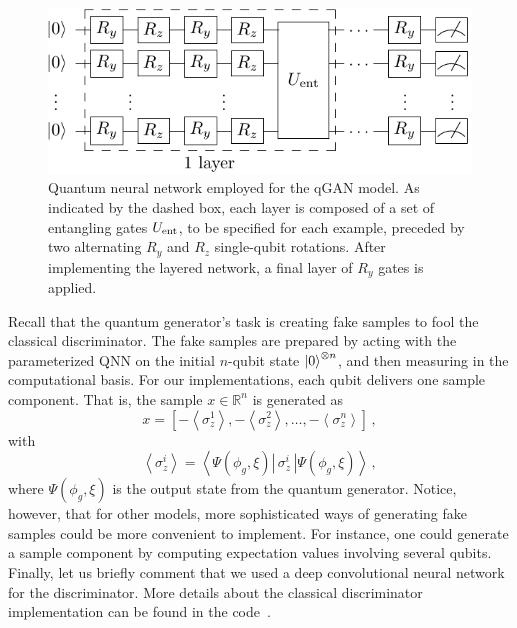 \documentclass[twocolumn,preprintnumbers,superscriptaddress]{revtex4-2}
\begin{document}
\begin{figure}
  \includegraphics[width=1.0\columnwidth]{plots/ansatz1.pdf}
  \caption{\label{fig:circuit}Quantum neural network employed for the qGAN model. As indicated by the dashed box, each layer is composed of a set of entangling gates $U_{\rm ent}$, to be specified for each example, preceded by two alternating $R_y$ and $R_z$ single-qubit rotations. After implementing the layered network, a final layer of $R_y$ gates is applied.}
\end{figure}

Recall that the quantum generator's task is creating fake samples to fool the classical discriminator. The fake samples are prepared by acting with the parameterized QNN on the initial $n$-qubit state $\ket{0}^{\otimes n}$, and then measuring in the computational basis. For our implementations, each qubit delivers one sample component. That is, the sample $x \in \mathbb{R}^n$ is generated as
\begin{equation}
    \label{eq:samples} x = \left[-\left\langle\sigma_z^1\right\rangle,-\left\langle\sigma_z^2\right\rangle,\hdots,-\left\langle\sigma_z^n\right\rangle\right]\,,
\end{equation}
with
\begin{equation}
    \label{eq:expectation}\left\langle\sigma_z^i\right\rangle = \left\langle\Psi(\phi_g,\xi)\left|\,\sigma_z^i\,\right|\Psi(\phi_g,\xi)\right\rangle \,,
\end{equation}
where $\Psi(\phi_g,\xi)$ is the output state from the quantum generator. Notice, however, that for other models, more sophisticated ways of generating fake samples could be more convenient to implement. For instance, one could generate a sample component by computing expectation values involving several qubits. Finally, let us briefly comment that we used a deep convolutional neural network for the discriminator. More details about the classical discriminator implementation can be found in the code~\cite{qGAN_github_code}.
\end{document}
